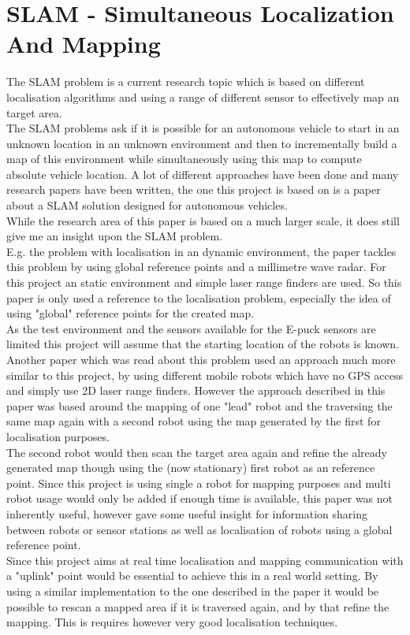 \section{SLAM - Simultaneous Localization And Mapping}
The SLAM problem is a current research topic which is based on different localisation algorithms and using a range of different sensor to effectively map an target area. \\
The SLAM problems ask if it is possible for an autonomous vehicle to start in an unknown location in an unknown environment and then to incrementally build a map of this environment while simultaneously using this map to compute absolute vehicle location\cite{Dissanayake2001Solution}.
A lot of different approaches have been done and many research papers have been written, the one this project is based on is a paper about a SLAM solution designed for autonomous vehicles\cite{Dissanayake2001Solution}.\\
While the research area of this paper is based on a much larger scale, it does still give me an insight upon the SLAM problem.\\
E.g. the problem with localisation in an dynamic environment, the paper tackles this problem by using global reference points and a millimetre wave radar. For this project an static environment and simple laser range finders are used. So this paper is only used a reference to the localisation problem, especially the idea of using "global" reference points for the created map.\\
As the test environment and the sensors available for the E-puck sensors are limited this project will assume that the starting location of the robots is known.\\[3ex]

Another paper which was read about this problem used an approach much more similar to this project, by using different mobile robots which have no GPS access and simply use 2D laser range finders. However the approach described in this paper was based around the mapping of one "lead" robot and the traversing the same map again with a second robot using the map generated by the first for localisation purposes.\\
The second robot would then scan the target area again and refine the already generated map though using the (now stationary) first robot as an reference point. Since this project is using single a robot for mapping purposes and multi robot usage would only be added if enough time is available, this paper was not inherently useful, however gave some useful insight for information sharing between robots or sensor stations as well as localisation of robots using a global reference point.\\
Since this project aims at real time localisation and mapping communication with a "uplink" point would be essential to achieve this in a real world setting. By using a similar implementation to the one described in the paper it would be possible to rescan a mapped area if it is traversed again, and by that refine the mapping. This is requires however very good localisation techniques.



